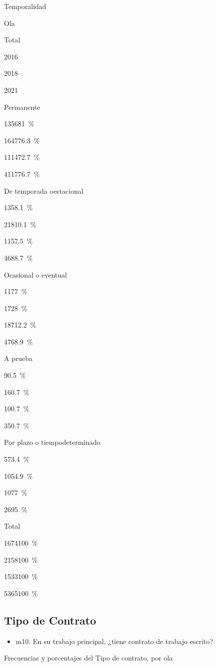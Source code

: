 \documentclass[
  12pt,
]{book}
\providecommand{\tightlist}{%
  \setlength{\itemsep}{0pt}\setlength{\parskip}{0pt}}
\begin{document}
Temporalidad

Ola

Total

2016

2018

2021

Permanente

{1356}{81~\%}

{1647}{76.3~\%}

{1114}{72.7~\%}

{4117}{76.7~\%}

De temporada oestacional

{135}{8.1~\%}

{218}{10.1~\%}

{115}{7.5~\%}

{468}{8.7~\%}

Ocasional o eventual

{117}{7~\%}

{172}{8~\%}

{187}{12.2~\%}

{476}{8.9~\%}

A prueba

{9}{0.5~\%}

{16}{0.7~\%}

{10}{0.7~\%}

{35}{0.7~\%}

Por plazo o tiempodeterminado

{57}{3.4~\%}

{105}{4.9~\%}

{107}{7~\%}

{269}{5~\%}

Total

{1674}{100~\%}

{2158}{100~\%}

{1533}{100~\%}

{5365}{100~\%}

\hypertarget{tipo-de-contrato}{%
\subsection{Tipo de Contrato}\label{tipo-de-contrato}}

\begin{itemize}
\tightlist
\item
  m10. En su trabajo principal, ¿tiene contrato de trabajo escrito?
\end{itemize}

Frecuencias y porcentajes del Tipo de contrato, por ola
\end{document}
